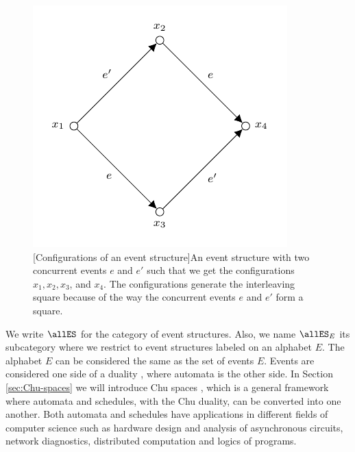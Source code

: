 \begin{figure}[ht]
        \centering
        \includegraphics[scale=1.3]{Figures/2.Models-for-concurrency/event-structure/interleaving-square.pdf}
        [Configurations of an event structure]{An event structure with two concurrent events $e$ and $e'$ such that we get the configurations $x_{1}, x_{2}, x_{3}$, and $x_{4}$. The configurations generate the interleaving square because of the way the concurrent events $e$ and $e'$ form a square.}
        \label{fig:interleaving-square-event-structure}
\end{figure}



 We write $\allES$ for the category of event structures. Also, we name $\allES_{E}$ its subcategory where we restrict to event structures labeled on an alphabet $E$. The alphabet $E$ can be considered the same as the set of events $E$. Events are considered one side of a duality \cite{Pratt02eventStateDuality}, where automata is the other side. In Section \ref{sec:Chu-spaces} we will introduce Chu spaces \cite{gupta94phd_Chu}, which is a general framework where automata and schedules, with the Chu duality, can be converted into one another. Both automata and schedules have applications in different fields of computer science such as hardware design and analysis of asynchronous circuits, network diagnostics, distributed computation and logics of programs. 